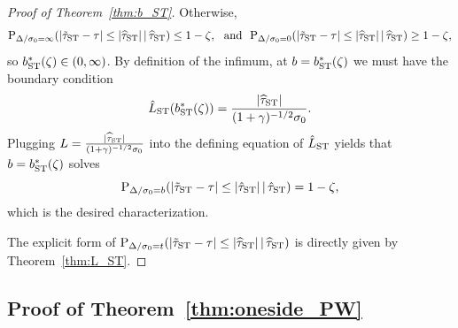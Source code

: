 \documentclass[11pt]{article}
\def\given{\,|\,}
\def\P{{\mathrm P}}
\newcommand{\htau}{\widehat\tau}
\numberwithin{equation}{section}
\theoremstyle{definition}
\begin{document}
\begin{proof}[Proof of Theorem~\ref{thm:b_ST}]
Otherwise,
\[
  \P_{\Delta/\sigma_0 = \infty}(\lvert \tilde\tau_{\rm ST} - \tau \rvert \le \lvert \htau_{\rm ST} \rvert \given \htau_{\rm ST}) \le 1-\zeta,~~ {\rm and}~~ \P_{\Delta/\sigma_0 = 0}(\lvert \tilde\tau_{\rm ST} - \tau \rvert \le \lvert \htau_{\rm ST} \rvert \given \htau_{\rm ST}) \ge 1-\zeta,
\]
so $b^*_{\rm ST}(\zeta) \in (0, \infty)$. By definition of the infimum, at
$b=b^*_{\rm ST}(\zeta)$ we must have the boundary condition
\[
\hat L_{\rm ST}(b^*_{\rm ST}(\zeta))
=
\frac{\lvert \htau_{\rm ST} \rvert}{(1+\gamma)^{-1/2}\sigma_0}.
\]
Plugging $L=\frac{\lvert \htau_{\rm ST} \rvert}{(1+\gamma)^{-1/2} \sigma_0}$ into the defining equation of $\hat{L}_{\rm ST}$ yields that $b = b^*_{\rm ST}(\zeta)$ solves
\[
  \P_{\Delta/\sigma_0 = b}(\lvert \tilde\tau_{\rm ST} - \tau \rvert \le \lvert \hat\tau_{\rm ST}\rvert \given \hat\tau_{\rm ST}) = 1-\zeta,
\]
which is the desired characterization.

The explicit form of $\P_{\Delta/\sigma_0 = t}(\lvert \tilde\tau_{\rm ST} - \tau \rvert \le \lvert \htau_{\rm ST} \rvert \given \htau_{\rm ST})$ is directly given by Theorem~\ref{thm:L_ST}.

\end{proof}


\subsection{Proof of Theorem~\ref{thm:oneside_PW}}
\end{document}
